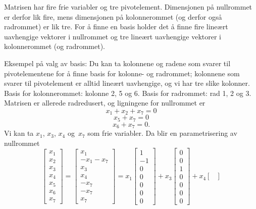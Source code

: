 \begin{losning}

\begin{punkt}
Matrisen har fire frie variabler og tre pivotelement. Dimensjonen på nullrommet er derfor lik fire, mens dimensjonen på kolonnerommet (og derfor også radrommet) er lik tre. For å finne en basis holder det å finne fire lineært uavhengige vektorer i nullrommet og tre lineært uavhengige vektorer i kolonnerommet (og radrommet).


\noindent
Eksempel på valg av basis: Du kan ta kolonnene og radene som svarer til pivotelementene for å finne basis for kolonne- og radrommet; kolonnene som svarer til pivotelement er alltid lineært uavhengige, og vi har tre slike kolonner. Basis for kolonnerommet: kolonne 2, 5 og 6. Basis for radrommet: rad 1, 2 og 3. Matrisen er allerede radredusert, og ligningene for nullrommet er $$x_1+x_2+x_7=0$$ $$x_5+x_7=0$$ $$x_6+x_7=0.$$ Vi kan ta $x_1$, $x_3$, $x_4$ og~$x_7$ som frie variabler. Da blir en parametrisering av nullrommet
$$\begin{bmatrix}
x_1\\
x_2\\
x_3\\
x_4\\
x_5\\
x_6\\
x_7
\end{bmatrix}=\begin{bmatrix}
x_1\\
-x_1-x_7\\
x_3\\
x_4\\
-x_7\\
-x_7\\
x_7
\end{bmatrix}=x_1\begin{bmatrix}
1\\
-1\\
0\\
0\\
0\\
0\\
0
\end{bmatrix}+x_3\begin{bmatrix}
0\\
0\\
1\\
0\\
0\\
0\\
0
\end{bmatrix}+x_4\begin{bmatrix}

\end{bmatrix}$$
\end{punkt}
\end{losning}

